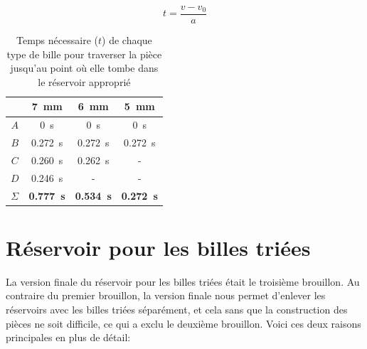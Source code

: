 \begin{equation}
     t = \frac{v - v_{0}}{a}
     \label{eq:rolling_time}
\end{equation}

\begin{table}[htbp]
    \centering
    \begin{tabular}{|c|c|c|c|}
        \hline
         & \SI{7}{\mm} & \SI{6}{\mm} & \SI{5}{\mm} \\
        \hline
        $A$ & \SI{0}{\s} & \SI{0}{\s} & \SI{0}{\s} \\
        \hline
        $B$ & \SI{0.272}{\s} & \SI{0.272}{\s} & \SI{0.272}{\s} \\
        \hline
        $C$ & \SI{0.260}{\s} & \SI{0.262}{\s} & - \\
        \hline
        $D$ & \SI{0.246}{\s} & - & - \\
        \hline\hline
        $\Sigma$ & \textbf{\SI{0.777}{\s}} & \textbf{\SI{0.534}{\s}} & \textbf{\SI{0.272}{\s}} \\
        \hline
    \end{tabular}
    \caption{Temps nécessaire ($t$) de chaque type de bille pour traverser la pièce jusqu'au point où elle tombe dans le réservoir approprié}
    \label{tab:results_rolling_time}
\end{table}







\section{Réservoir pour les billes triées}
La version finale du réservoir pour les billes triées était le troisième brouillon. Au contraire du premier brouillon, la version finale nous permet d'enlever les réservoirs avec les billes triées séparément, et cela sans que la construction des pièces ne soit difficile, ce qui a exclu le deuxième brouillon. Voici ces deux raisons principales en plus de détail:

